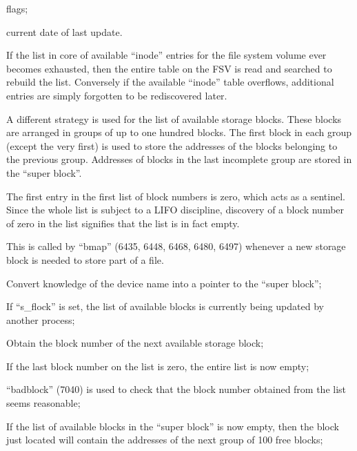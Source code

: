 \item flags;

\item current date of last update.
\ei


If the list in core of available
``inode'' entries for the file system
volume ever becomes exhausted, then the
entire table on the FSV is read and
searched to rebuild the list. Conversely if the available ``inode'' table
overflows, additional entries are simply forgotten to be rediscovered later.


A different strategy is used for the
list of available storage blocks.
These blocks are arranged in groups of
up to one hundred blocks. The first
block in each group (except the very
first) is used to store the addresses
of the blocks belonging to the previous
group. Addresses of blocks in the last
incomplete group are stored in the
``super block''.

The first entry in the first list of
block numbers is zero, which acts as a
sentinel. Since the whole list is subject to a LIFO discipline, discovery of
a block number of zero in the list signifies that the list is in fact empty.



This is called by ``bmap'' (6435, 6448,
6468, 6480, 6497) whenever a new
storage block is needed to store part
of a file.

\bd
\item[6961:] Convert knowledge of the device
      name into a pointer to the ``super
      block'';

\item[6962:] If ``s\_flock'' is set, the list of
      available blocks is currently
      being updated by another process;

\item[6967:] Obtain the block  number  of  the
      next available storage block;

\item[6968:] If the last block number  on  the
      list  is zero, the entire list is
      now empty;

\item[6970:] ``badblock''  (7040)  is  used   to
      check   that   the  block  number
      obtained from the list seems reasonable;

\item[6971:] If the list of  available  blocks
      in   the  ``super  block''  is  now
      empty,  then   the   block   just
      located    will    contain    the
      addresses of the  next  group  of 100 free blocks;


